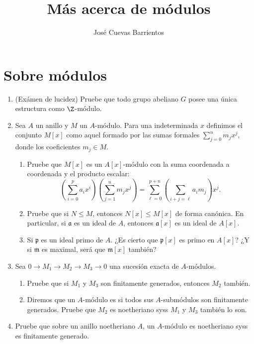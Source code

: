 \documentclass[11pt, reqno]{amsart}
\title{Más acerca de módulos}
\date{\DTMdate{2025-05-22}}
\author{José Cuevas Barrientos}
\begin{document}
\maketitle

\nocite{atiyah:commutative}

\section{Sobre módulos}
\begin{enumerate}
	\item\lookright
		(Exámen de lucidez)
		Pruebe que todo grupo abeliano $G$ posee una única estructura como $\Z$-módulo.
	\item Sea $A$ un anillo y $M$ un $A$-módulo.
		Para una indeterminada $x$ definimos el conjunto $M[x]$ como aquel formado por las sumas formales
		$\sum_{j=0}^{n} m_jx^j$, donde los coeficientes $m_j \in M$.
		\begin{enumerate}
			\item Pruebe que $M[x]$ es un $A[x]$-módulo con la suma coordenada a coordenada y el producto
				escalar:
				\[
					\left( \sum_{i=0}^{p} a_ix^i \right)\left( \sum_{j=1}^{n} m_jx^j \right) =
					\sum_{\ell=0}^{p+n} \left( \sum_{i+j=\ell} a_im_j \right) x^j.
				\]
			\item Pruebe que si $N \le M$, entonces $N[x] \le M[x]$ de forma canónica.
				En particular, si $\mathfrak{a}$ es un ideal de $A$, entonces $\mathfrak{a}[x]$ es un
				ideal de $A[x]$.
			\item\lookright
				Si $\mathfrak{p}$ es un ideal primo de $A$.
				¿Es cierto que $\mathfrak{p}[x]$ es primo en $A[x]$?
				¿Y si $\mathfrak{m}$ es maximal, será que $\mathfrak{m}[x]$ también?
		\end{enumerate}

	\item Sea $0 \to M_1 \to M_2 \to M_3 \to 0$ una sucesión exacta de $A$-módulos.
		\begin{enumerate}
			\item Pruebe que si $M_1$ y $M_3$ son finitamente generados, entonces $M_2$ también.
			\item Diremos que un $A$-módulo es  si todos sus $A$-submódulos son finitamente generados.
				Pruebe que $M_2$ es noetheriano syss $M_1$ y $M_3$ también lo son.
		\end{enumerate}

	\item\label{ex:noetherian_modules}
		Pruebe que sobre un anillo noetheriano $A$, un $A$-módulo es noetheriano syss es finitamente generado.
\end{enumerate}
\end{document}
